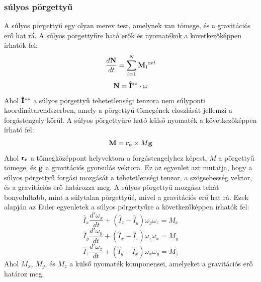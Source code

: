 \documentclass[a4paper,12pt]{article}
\begin{document}
\subsubsection*{súlyos pörgettyű}
A súlyos pörgettyű egy olyan merev test, amelynek van tömege, és a gravitációs erő hat rá. A súlyos pörgettyűre ható erők és nyomatékok a következőképpen írhatók fel:
\begin{equation}
    \frac{d\bold{N}}{dt} = \sum_{i=1}^{N} \bold{M_i}^{ext}
\end{equation}
\begin{equation}
    \bold{N} = \bold{\hat{I}^{**}} \cdot \bold{\omega}
\end{equation}
Ahol $\bold{\hat{I}^{**}}$ a súlyos pörgettyű tehetetlenségi tenzora nem súlyponti koordinátarendszerben, amely a pörgettyű tömegének eloszlását jellemzi a forgástengely körül.
A súlyos pörgettyűre ható külső nyomaték a következőképpen írható fel:
\begin{equation}
    \bold{M} = \bold{r_c} \times M \bold{g}
\end{equation}
Ahol $\bold{r_c}$ a tömegközéppont helyvektora a forgástengelyhez képest, $M$ a pörgettyű tömege, és $\bold{g}$ a gravitációs gyorsulás vektora.
Ez az egyenlet azt mutatja, hogy a súlyos pörgettyű forgási mozgását a tehetetlenségi tenzor, a szögsebesség vektor, és a gravitációs erő határozza meg. A súlyos pörgettyű mozgása tehát bonyolultabb, mint a súlytalan pörgettyűé, mivel a gravitációs erő hat rá.
Ezek alapján az Euler egyenletek a súlyos pörgettyűre a következőképpen írhatók fel:
\begin{equation}
    \hat{I}_x \frac{d'\omega_x}{dt} + (\hat{I}_z - \hat{I}_y) \omega_y \omega_z = M_x
\end{equation}
\begin{equation}
    \hat{I}_y \frac{d'\omega_y}{dt} + (\hat{I}_x - \hat{I}_z) \omega_z \omega_x = M_y
\end{equation}
\begin{equation}
    \hat{I}_z \frac{d'\omega_z}{dt} + (\hat{I}_y - \hat{I}_x) \omega_x \omega_y = M_z
\end{equation}
Ahol $M_x$, $M_y$, és $M_z$ a külső nyomaték komponensei, amelyeket a gravitációs erő határoz meg.
\end{document}
